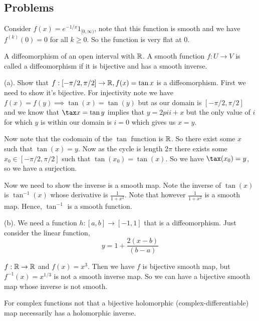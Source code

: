 \subsection{Problems}


\begin{problem}
  Consider $f(x) = e^{-1 / x}1_{[0, \infty)}$, note that this function is smooth and we have $f^{(k)}(0) = 0$ for all $k \ge 0$. So the function is very flat at $0$.
\end{problem}

\begin{problem}
  A diffeomorphism of an open interval with $\mathbb{R}$. A smooth function $f: U \to V$ is called a diffeomorphism if it is bijective and has a smooth inverse.
  \vspace{1em}
  
  (a). Show that $f:[-\pi / 2, \pi / 2] \to \mathbb{R}, f(x) = \tan x$  is a diffeomorphism. First we need to show it's bijective. For injectivity note we have $f(x) = f(y) \implies \tan (x) = \tan(y)$ but as our domain is $[-\pi / 2, \pi / 2]$ and we know that $\tax x = \tan y$ implies that $y = 2pi i + x$ but the only value of $i$ for which $y$ is within our domain is $i = 0$ which gives us $x = y$. 

  \vspace{1em}
  
  Now note that the codomain of the $\tan$ function is $\mathbb{R}$. So there exist some $x$ such that $\tan (x) = y$. Now as the cycle is length $2\pi$ there exists some $x_{0} \in [-\pi / 2, \pi / 2]$ such that $\tan(x_{0}) = \tan(x)$. So we have $\tax(x_{0}) = y$, so we have a surjection.

  \vspace{1em}

  Now we need to show the inverse is a smooth map. Note the inverse of $\tan (x)$ is $\tan^{-1}(x)$ whose derivative is $\frac{1}{1 + x^2}$. Note that however $\frac{1}{1 + x^2}$ is a smooth map. Hence, $\tan^{-1}$ is a smooth function.


  \vspace{1em}
  
  (b). We need a function $h:[a,b] \to [-1, 1]$ that is a diffeomorphism. Just consider the linear function, 
  \[
    y= 1 + \frac{2\left(x-b\right)}{\left(b-a\right)}
  \]

\end{problem}

\begin{problem}
  $f: \mathbb{R} \to \mathbb{R}$ and $f(x) = x^{3}$. Then we have $f$ is bijective smooth map, but $f^{-1}(x) = x^{1 / 3}$ is not a smooth inverse map. So we can have a bijective smooth  map whose inverse is not smooth.
\end{problem}
\begin{remark}
  For complex functions not that a bijective holomorphic (complex-differentiable) map necessarily has a holomorphic inverse.
\end{remark}

